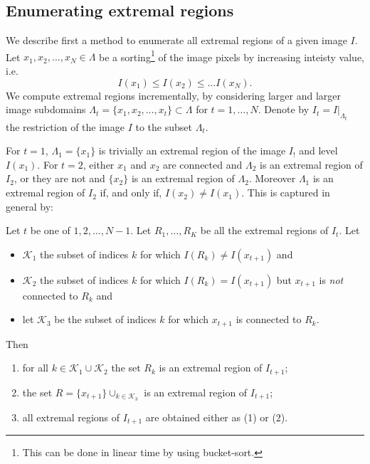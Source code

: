 \documentclass{article}
\begin{document}
\subsection{Enumerating extremal regions}

We describe first a method to enumerate all extremal regions of a given image $I$. Let $x_1,x_2,\ldots,x_N \in \Lambda$ be a sorting\footnote{This can be done in linear time by using bucket-sort.} of the image pixels by increasing inteisty value, i.e.
\[ I(x_1) \leq I(x_2) \leq \dots I(x_N). \]
We compute extremal regions incrementally, by considering larger and larger image subdomains $\Lambda_t = \{x_1,x_2,\dots,x_t\}\subset \Lambda$ for $t=1,\dots,N$. Denote by $I_t = I|_{\Lambda_t}$ the restriction of the image $I$ to the subset $\Lambda_t$.

For $t=1$, $\Lambda_1 = \{x_1\}$ is trivially an extremal region of the image $I_!$ and level $I(x_1)$. For $t=2$, either $x_1$ and $x_2$ are connected and $\Lambda_2$ is an extremal region of $I_2$, or they are not and $\{x_2\}$ is an extremal region of $\Lambda_2$. Moreover $\Lambda_1$ is an extremal region of $I_2$ if, and only if, $I(x_2)\not=I(x_1)$. This is captured in general by:

\begin{lemma}\label{lemma:er-fund} 
Let $t$ be one of $1,2,\dots,N-1$. Let $R_1,\ldots,R_K$ be all the extremal regions of $I_t$. Let
\begin{itemize}
\item
$\mathcal{K}_1$ the subset of indices $k$ for which $I(R_k) \not= I(x_{t+1})$ and 
\item
$\mathcal{K}_2$ the subset of indices $k$ for which $I(R_k) = I(x_{t+1})$ but $x_{t+1}$ is {\em not} connected to $R_k$ and
\item
let $\mathcal{K}_3$ be the subset of indices $k$ for which $x_{t+1}$ is connected to $R_k$. 
\end{itemize}
Then
	\begin{enumerate}
		\item for all $k\in\mathcal{K}_1 \cup \mathcal{K}_2$ the set $R_k$ is an extremal region of $I_{t+1}$;
		
		\item the set $R = \{x_{t+1}\} \cup_{k \in\mathcal{K}_3}$ is an extremal region of $I_{t+1}$;
		
		\item all extremal regions of $I_{t+1}$ are obtained either as (1) or (2). 
	\end{enumerate}
\end{lemma}
\end{document}
